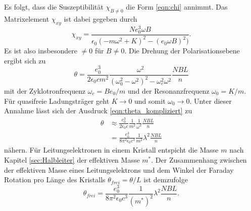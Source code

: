 Es folgt, dass die Suszeptibilität $\chi_{B\neq 0}$ die Form \ref{eqn:chi} annimmt. Das Matrixelement $\chi_{xy}$ ist dabei gegeben 
durch 
\begin{equation*}
    \chi_{xy}=\frac{Ne_0^3\omega B}{\epsilon_0(-m\omega^2+K)^2-(e_0\omega B)^2)} .
\end{equation*}
Es ist also insbesondere $\neq 0$ für $B\neq 0$. Die Drehung der Polarisationsebene ergibt sich zu 
\begin{equation}
    \theta=\frac{e_0^3}{2\epsilon_0 c m^2}\frac{\omega^2}{(\omega_0^2-\omega^2)^2-\omega_c^2\omega^2}\frac{NBL}{n}
    \label{eqn:theta_kompliziert}
\end{equation}
mit der Zyklotronfrequenz $\omega_c=Be_0/m$ und der Resonanzfrequenz $\omega_0=K/m$. 
Für quasifreie Ladungsträger geht $K\to0$ und somit $\omega_0\to 0$. Unter dieser Annahme lässt sich der Ausdruck 
\ref{eqn:theta_kompliziert} zu
\begin{align*}
    \theta&\approx\frac{e_0^3}{2\epsilon_0 c}\frac{1}{m^2}\frac{1}{\omega^2}\frac{NBL}{n}\\
    &=\frac{e_0^3}{8\pi^2\epsilon_0c^3}\frac{1}{m^2}\lambda^2\frac{NBL}{n}
\end{align*} 
nähern. Für Leitungselektronen in einem Kristall entspicht die Masse $m$ nach Kapitel \ref{sec:Halbleiter} der effektiven
Masse $m^*$. Der Zusammenhang zwischen der effektiven Masse eines Leitungselektrons und dem Winkel der Faraday Rotation pro
Länge des Kristalls $\theta_{frei}=\theta/L$ ist demzufolge
\begin{equation}
    \theta_{frei}=\frac{e_0^3}{8\pi^2\epsilon_0c^3}\frac{1}{(m^*)^2}\lambda^2\frac{NBL}{n}.
    \label{eqn:winkel_masse}
\end{equation}